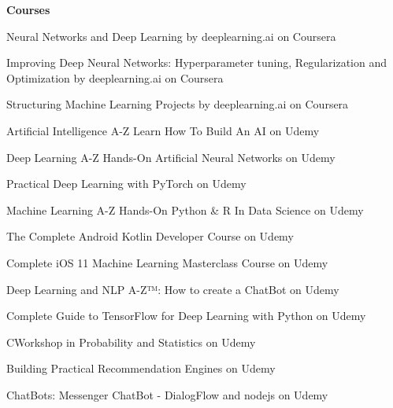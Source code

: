   \begin{cventries}

 \cventry
 {\bf Courses}
 {}
 {}
 {}
    {
      \begin{cvitems} %
        \item {Neural Networks and Deep Learning by deeplearning.ai on Coursera}
        \item {Improving Deep Neural Networks: Hyperparameter tuning, Regularization and Optimization by deeplearning.ai on Coursera}
        \item {Structuring Machine Learning Projects by deeplearning.ai on Coursera}
        \item {Artificial Intelligence A-Z Learn How To Build An AI on Udemy}
        \item {Deep Learning A-Z Hands-On Artificial Neural Networks on Udemy}
        \item {Practical Deep Learning with PyTorch on Udemy}
        \item {Machine Learning A-Z Hands-On Python \& R In Data Science on Udemy}
        \item {The Complete Android Kotlin Developer Course on Udemy}
        \item {Complete iOS 11 Machine Learning Masterclass Course on Udemy}
        \item {Deep Learning and NLP A-Z™: How to create a ChatBot on Udemy}
        \item {Complete Guide to TensorFlow for Deep Learning with Python on Udemy}
        \item {CWorkshop in Probability and Statistics on Udemy}
        \item {Building Practical Recommendation Engines on Udemy}
        \item {ChatBots: Messenger ChatBot - DialogFlow and nodejs on Udemy}
      \end{cvitems}
    }

\end{cventries}
